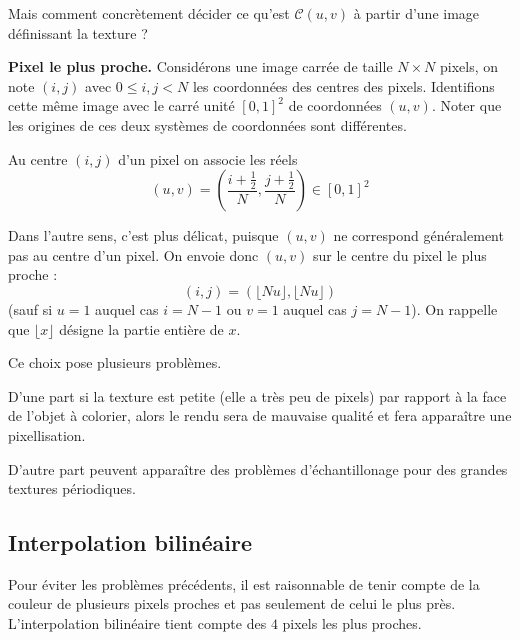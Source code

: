 \documentclass[11pt,class=report,crop=false]{standalone}
\begin{document}


Mais comment concrètement décider ce qu'est $\mathcal{C}(u,v)$ à partir d'une image définissant la texture ?

\textbf{Pixel le plus proche.}
Considérons une image carrée de taille $N\times N$ pixels, on note $(i,j)$ avec $0 \le i,j < N$ les coordonnées des centres des pixels. Identifions cette même image avec le carré unité $[0,1]^2$ de coordonnées $(u,v)$. Noter que les origines de ces deux systèmes de coordonnées sont différentes.


Au centre $(i,j)$ d'un pixel on associe les réels 
$$(u,v) = \left(\frac{i+\frac12}{N}, \frac{j+\frac12}{N} \right)\in [0,1]^2$$



Dans l'autre sens, c'est plus délicat, puisque $(u,v)$ ne correspond généralement pas au centre d'un pixel.
On envoie donc $(u,v)$ sur le centre du pixel le plus proche :
$$(i,j) = \left( \lfloor Nu \rfloor, \lfloor Nu \rfloor \right)$$
(sauf si $u=1$ auquel cas $i=N-1$ ou $v=1$ auquel cas $j=N-1$).
On rappelle que $\lfloor x \rfloor$ désigne la partie entière de $x$.

Ce choix pose plusieurs problèmes.

D'une part si la texture est petite (elle a très peu de pixels) par rapport à la face de l'objet à colorier, alors le rendu sera de mauvaise qualité et fera apparaître une pixellisation.



D'autre part peuvent apparaître des problèmes d'échantillonage pour des grandes textures périodiques.



\subsection{Interpolation bilinéaire}


Pour éviter les problèmes précédents, il est raisonnable de tenir compte de la couleur de plusieurs pixels proches et pas seulement de celui le plus près. L'interpolation bilinéaire tient compte des $4$ pixels les plus proches.
\end{document}
